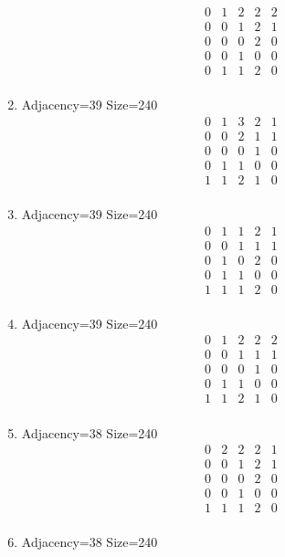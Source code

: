 \documentclass[12pt]{article}
\begin{document}
\begin{multicols}{3}
\begin{enumerate}
\begin{equation*}
\begin{array}{ccccc}
0&1&2&2&2\\
0&0&1&2&1\\
0&0&0&2&0\\
0&0&1&0&0\\
0&1&1&2&0\\
\end{array}
\end{equation*}
\item Adjacency=39 Size=240
\begin{equation*}
\begin{array}{ccccc}
0&1&3&2&1\\
0&0&2&1&1\\
0&0&0&1&0\\
0&1&1&0&0\\
1&1&2&1&0\\
\end{array}
\end{equation*}
\item Adjacency=39 Size=240
\begin{equation*}
\begin{array}{ccccc}
0&1&1&2&1\\
0&0&1&1&1\\
0&1&0&2&0\\
0&1&1&0&0\\
1&1&1&2&0\\
\end{array}
\end{equation*}
\item Adjacency=39 Size=240
\begin{equation*}
\begin{array}{ccccc}
0&1&2&2&2\\
0&0&1&1&1\\
0&0&0&1&0\\
0&1&1&0&0\\
1&1&2&1&0\\
\end{array}
\end{equation*}
\item Adjacency=38 Size=240
\begin{equation*}
\begin{array}{ccccc}
0&2&2&2&1\\
0&0&1&2&1\\
0&0&0&2&0\\
0&0&1&0&0\\
1&1&1&2&0\\
\end{array}
\end{equation*}
\item Adjacency=38 Size=240

\end{enumerate}
\end{multicols}
\end{document}
